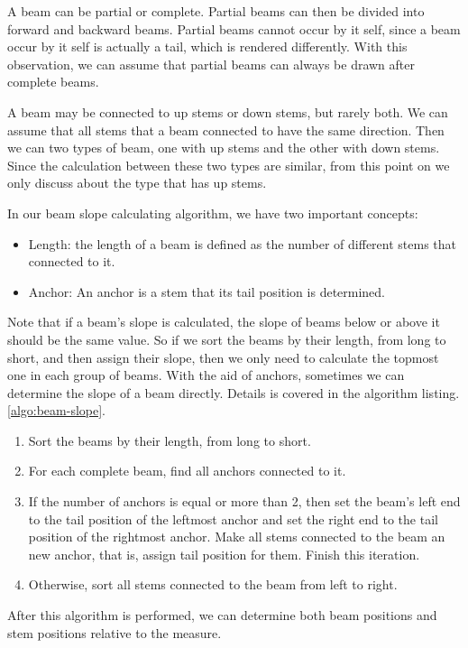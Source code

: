 A beam can be partial or complete. Partial beams can then be divided into forward and backward beams. Partial beams cannot occur by it self, since a beam occur by it self is actually a tail, which is rendered differently. With this observation, we can assume that partial beams can always be drawn after complete beams.

A beam may be connected to up stems or down stems, but rarely both. We can assume that all stems that a beam connected to have the same direction. Then we can two types of beam, one with up stems and the other with down stems. Since the calculation between these two types are similar, from this point on we only discuss about the type that has up stems.

In our beam slope calculating algorithm, we have two important concepts:
\begin{itemize}
    \item Length:
the length of a beam is defined as the number of different stems that connected to it. 
    \item Anchor:
        An anchor is a stem that its tail position is determined.
\end{itemize}

Note that if a beam's slope is calculated, the slope of beams below or above it should be the same value. So if we sort the beams by their length, from long to short, and then assign their slope, then we only need to calculate the topmost one in each group of beams. With the aid of anchors, sometimes we can determine the slope of a beam directly. Details is covered in the algorithm listing. \ref{algo:beam-slope}.

\begin{enumerate}
\item Sort the beams by their length, from long to short.
\item For each complete beam, find all anchors connected to it.
\item If the number of anchors is equal or more than 2, then set the beam's left end to the tail position of the leftmost anchor and set the right end to the tail position of the rightmost anchor. Make all stems connected to the beam an new anchor, that is, assign tail position for them. Finish this iteration.
\item Otherwise, sort all stems connected to the beam from left to right.
\end{enumerate}

After this algorithm is performed, we can determine both beam positions and stem positions relative to the measure.

